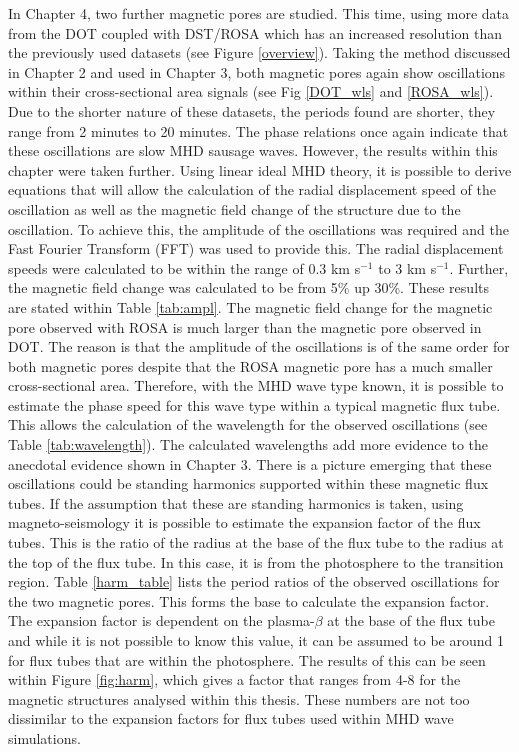     In Chapter 4, two further magnetic pores are studied.
    This time, using more data from the DOT coupled with DST/ROSA which has an increased resolution than the previously used datasets (see Figure \ref{overview}).
    Taking the method discussed in Chapter 2 and used in Chapter 3, both magnetic pores again show oscillations within their cross-sectional area signals (see Fig \ref{DOT_wls} and \ref{ROSA_wls}).     
    Due to the shorter nature of these datasets, the periods found are shorter, they range from 2 minutes to 20 minutes.
    The phase relations once again indicate that these oscillations are slow MHD sausage waves.
    However, the results within this chapter were taken further.
    Using linear ideal MHD theory, it is possible to derive equations that will allow the calculation of the radial displacement speed of the oscillation as well as the magnetic field change of the structure due to the oscillation.
    To achieve this, the amplitude of the oscillations was required and the Fast Fourier Transform (FFT) was used to provide this.
    The radial displacement speeds were calculated to be within the range of 0.3 km s$^{-1}$ to 3 km s$^{-1}$. 
    Further, the magnetic field change was calculated to be from 5\% up 30\%. 
    These results are stated within Table \ref{tab:ampl}.
    The magnetic field change for the magnetic pore observed with ROSA is much larger than the magnetic pore observed in DOT.
    The reason is that the amplitude of the oscillations is of the same order for both magnetic pores despite that the ROSA magnetic pore has a much smaller cross-sectional area.
    Therefore, with the MHD wave type known, it is possible to estimate the phase speed for this wave type within a typical magnetic flux tube.
    This allows the calculation of the wavelength for the observed oscillations (see Table \ref{tab:wavelength}).
    The calculated wavelengths add more evidence to the anecdotal evidence shown in Chapter 3.
    There is a picture emerging that these oscillations could be standing harmonics supported within these magnetic flux tubes. 
    If the assumption that these are standing harmonics is taken, using magneto-seismology it is possible to estimate the expansion factor of the flux tubes.
    This is the ratio of the radius at the base of the flux tube to the radius at the top of the flux tube.
    In this case, it is from the photosphere to the transition region.
    Table \ref{harm_table} lists the period ratios of the observed oscillations for the two magnetic pores.
    This forms the base to calculate the expansion factor.
    The expansion factor is dependent on the plasma-$\beta$ at the base of the flux tube and while it is not possible to know this value, it can be assumed to be around 1 for flux tubes that are within the photosphere.
    The results of this can be seen within Figure \ref{fig:harm}, which gives a factor that ranges from 4-8 for the magnetic structures analysed within this thesis.
    These numbers are not too dissimilar to the expansion factors for flux tubes used within MHD wave simulations.
    
